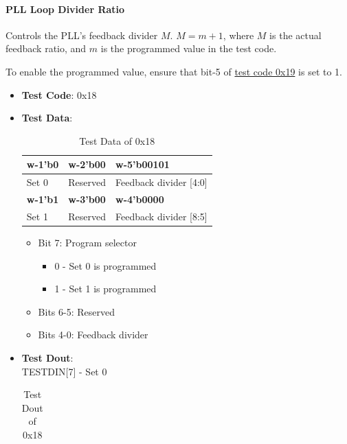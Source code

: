 \documentclass[main\_\_EN.tex]{subfiles}
\begin{document}
\paragraph{PLL Loop Divider Ratio}
\label{sec:test-code-0x18}
Controls the PLL's feedback divider $M$. $M = m + 1$, where $M$ is the actual feedback ratio, and $m$ is the programmed value in the test code.

To enable the programmed value, ensure that bit-5 of \hyperref[sec:test-code-0x19]{test code 0x19} is set to 1.

\begin{itemize}
    \item \textbf{Test Code}: 0x18
    \item \textbf{Test Data}: 
        \begin{longtable}{ |p{4cm}|p{4cm}|p{4cm}|}
            \caption{Test Data of 0x18}
            \label{tab:test-data-0x18} \\
            \hline
            \rowcolor{lightgray}
            \textbf{w-1'b0} & \textbf{w-2'b00} & \textbf{w-5'b00101} \\ \hline
            Set 0 & Reserved & Feedback divider [4:0]  \\ \hline
            \rowcolor{lightgray}
            \textbf{w-1'b1} & \textbf{w-3'b00} & \textbf{w-4'b0000} \\ \hline
            Set 1 & Reserved & Feedback divider [8:5]  \\ \hline
        \end{longtable}
        \begin{itemize}
            \item Bit 7: Program selector
                \begin{itemize}
                    \item 0 - Set 0 is programmed
                    \item 1 - Set 1 is programmed
                \end{itemize}
            \item Bits 6-5: Reserved
            \item Bits 4-0: Feedback divider
        \end{itemize}
    \item \textbf{Test Dout}:\\
        TESTDIN[7] - Set 0
        \begin{longtable}{ |p{4cm}|p{8cm}|}
            \caption{Test Dout of 0x18}
            \label{tab:test-dout-0x18-set0} \\

\end{longtable}
\end{itemize}
\end{document}
